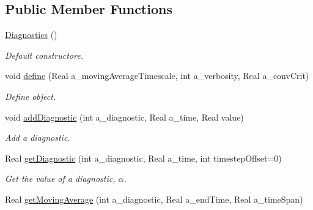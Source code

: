 \subsection*{Public Member Functions}
\begin{DoxyCompactItemize}
\item 
\hypertarget{class_diagnostics_a24c4f22a9628a083b82a194089cfdd19}{\hyperlink{class_diagnostics_a24c4f22a9628a083b82a194089cfdd19}{Diagnostics} ()}\label{class_diagnostics_a24c4f22a9628a083b82a194089cfdd19}

\begin{DoxyCompactList}\small\item\em Default constructore. \end{DoxyCompactList}\item 
\hypertarget{class_diagnostics_a33a91e98836bc1c3bf022c09a97b5e51}{void \hyperlink{class_diagnostics_a33a91e98836bc1c3bf022c09a97b5e51}{define} (Real a\-\_\-moving\-Average\-Timescale, int a\-\_\-verbosity, Real a\-\_\-conv\-Crit)}\label{class_diagnostics_a33a91e98836bc1c3bf022c09a97b5e51}

\begin{DoxyCompactList}\small\item\em Define object. \end{DoxyCompactList}\item 
\hypertarget{class_diagnostics_a4051c6c9cfa8a2c0fa30ee2bdd3ff8b5}{void \hyperlink{class_diagnostics_a4051c6c9cfa8a2c0fa30ee2bdd3ff8b5}{add\-Diagnostic} (int a\-\_\-diagnostic, Real a\-\_\-time, Real value)}\label{class_diagnostics_a4051c6c9cfa8a2c0fa30ee2bdd3ff8b5}

\begin{DoxyCompactList}\small\item\em Add a diagnostic. \end{DoxyCompactList}\item 
\hypertarget{class_diagnostics_adbcc14b64242b09e780950d8814608db}{Real \hyperlink{class_diagnostics_adbcc14b64242b09e780950d8814608db}{get\-Diagnostic} (int a\-\_\-diagnostic, Real a\-\_\-time, int timestep\-Offset=0)}\label{class_diagnostics_adbcc14b64242b09e780950d8814608db}

\begin{DoxyCompactList}\small\item\em Get the value of a diagnostic, $ \alpha $. \end{DoxyCompactList}\item 
\hypertarget{class_diagnostics_a8213d3b6dc239506777f7161a07b5635}{Real \hyperlink{class_diagnostics_a8213d3b6dc239506777f7161a07b5635}{get\-Moving\-Average} (int a\-\_\-diagnostic, Real a\-\_\-end\-Time, Real a\-\_\-time\-Span)}\label{class_diagnostics_a8213d3b6dc239506777f7161a07b5635}


\end{DoxyCompactItemize}
